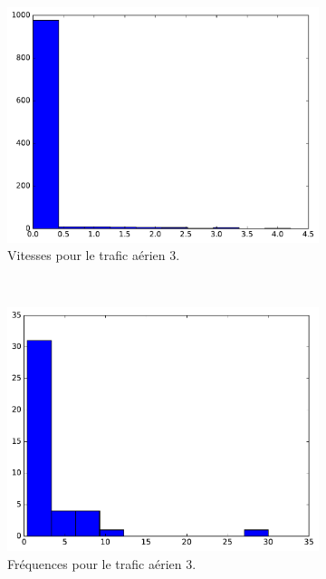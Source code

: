 	\begin{figure}
		\begin{subfigure}[t]{\subImgWaStats}
			\centering
			\includegraphics[width=\textwidth]{figures/ch3/hkg_speed}
			\caption{Vitesses pour le trafic aérien 3.}
			\label{fig:hkg_speed}
		\end{subfigure}
		~
		\begin{subfigure}[t]{\subImgWaStats}
			\centering
			\includegraphics[width=\textwidth]{figures/ch3/hkg_frequency}
			\caption{Fréquences pour le trafic aérien 3.}
			\label{fig:hkg_frequency}
		\end{subfigure}
		~
		\begin{subfigure}[t]{\subImgWaStats}

\end{subfigure}
\end{figure}

